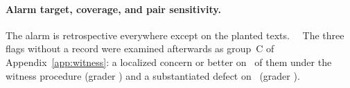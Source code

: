 \paragraph{Alarm target, coverage, and pair sensitivity.} The alarm is retrospective everywhere except on the planted texts. \ALARMTXT\ \ALARMPAIRTXT\ The three flags without a record were examined afterwards as group~C of Appendix~\ref{app:witness}: a localized concern or better on \WITNESSRESC\ of them under the witness procedure (grader \GRADERRESC) and a substantiated defect on \WITNESSSUBC\ (grader \GRADERSUBC).

\begin{table}[htbp]
  \caption{Cross-evaluator disagreement on $S$ as an alarm for credited-defective texts and all documented-defective texts (applicable lineages).}
  \label{tab:alarm}
  \centering\scriptsize\renewcommand{\arraystretch}{0.92}
\ALARMTABLE
\end{table}

\begin{table}[htbp]
  \caption{Pair sensitivity of the alarm: flags and hits of each evaluator pair, and of the full panel, on the credited-defective and documented-defective texts.}
  \label{tab:alarmpairs}
  \centering\scriptsize\renewcommand{\arraystretch}{0.92}
\ALARMPAIRTABLE
\end{table}

